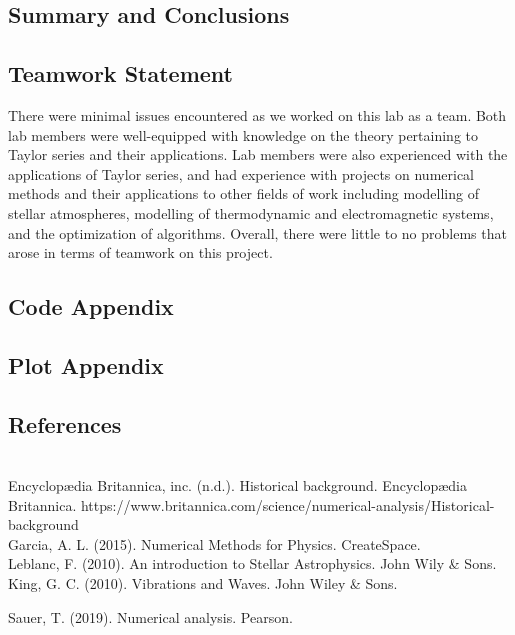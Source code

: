 \documentclass[letter,11pt]{article}
\begin{document}
\subsection*{Summary and Conclusions}

\begin{thebibliography}{99}
\end{thebibliography}

\subsection*{Teamwork Statement}
There were minimal issues encountered as we worked on this lab as a team.
Both lab members were well-equipped with knowledge on the theory pertaining to Taylor series and their applications.
Lab members were also experienced with the applications of Taylor series, and had experience with projects on numerical methods and their applications to other fields of work including modelling of stellar atmospheres, modelling of thermodynamic and electromagnetic systems, and the optimization of algorithms.
Overall, there were little to no problems that arose in terms of teamwork on this project.

\subsection*{Code Appendix}

\subsection*{Plot Appendix}


\subsection*{References}\\

  \tab Encyclopædia Britannica, inc. (n.d.). Historical background. Encyclopædia Britannica. https://www.britannica.com/science/numerical-analysis/Historical-background\\

  Garcia, A. L. (2015). Numerical Methods for Physics. CreateSpace.\\

  Leblanc, F. (2010). An introduction to Stellar Astrophysics. John Wily & Sons.\\

  King, G. C. (2010). Vibrations and Waves. John Wiley & Sons.

  Sauer, T. (2019). Numerical analysis. Pearson.
\end{document}
